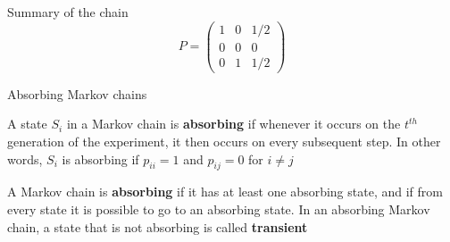 \documentclass[aspectratio=169]{beamer}\usepackage[]{graphicx}\usepackage[]{xcolor}
\begin{document}
\begin{frame}{Summary of the chain}
    \[
    P = \begin{pmatrix}
    1 & 0 & 1/2 \\
    0 & 0 & 0 \\
    0 & 1 & 1/2
    \end{pmatrix}
    \]
    
    \vfill
\begin{center}
\end{center}    
\end{frame}



\begin{frame}{Absorbing Markov chains}
\begin{definition}
A state $S_i$ in a Markov chain is \textbf{absorbing} if whenever it occurs on the $t^{th}$ generation of the experiment, it then occurs on every subsequent step. In other words, $S_i$ is absorbing if $p_{ii}=1$ and $p_{ij}=0$ for $i\neq j$
\end{definition}
\vfill
\begin{definition}
A Markov chain is \textbf{absorbing} if it has at least one absorbing state, and if from every state it is possible to go to an absorbing state.
In an absorbing Markov chain, a state that is not absorbing is called \textbf{transient}
\end{definition}
\end{frame}
\end{document}
